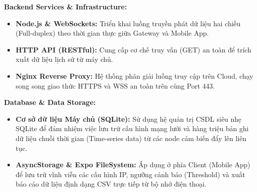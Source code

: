 \documentclass{article}
\begin{document}
\textbf{Backend Services \& Infrastructure:}
\begin{itemize}
    \item \textbf{Node.js \& WebSockets:} Triển khai luồng truyền phát dữ liệu hai chiều (Full-duplex) theo thời gian thực giữa Gateway và Mobile App.
    \item \textbf{HTTP API (RESTful):} Cung cấp cơ chế truy vấn (GET) an toàn để trích xuất dữ liệu lịch sử từ máy chủ.
    \item \textbf{Nginx Reverse Proxy:} Hệ thống phân giải luồng truy cập trên Cloud, chạy song song giao thức HTTPS và WSS an toàn trên cùng Port 443.
\end{itemize}

\textbf{Database \& Data Storage:}
\begin{itemize}
    \item \textbf{Cơ sở dữ liệu Máy chủ (SQLite):} Sử dụng hệ quản trị CSDL siêu nhẹ SQLite để đảm nhiệm việc lưu trữ cấu hình mạng lưới và hàng triệu bản ghi dữ liệu chuỗi thời gian (Time-series data) từ các node cảm biến đẩy lên liên tục.
    \item \textbf{AsyncStorage \& Expo FileSystem:} Áp dụng ở phía Client (Mobile App) để lưu trữ vĩnh viễn các cấu hình IP, ngưỡng cảnh báo (Threshold) và xuất báo cáo dữ liệu định dạng CSV trực tiếp từ bộ nhớ điện thoại.
\end{itemize}
\end{document}
